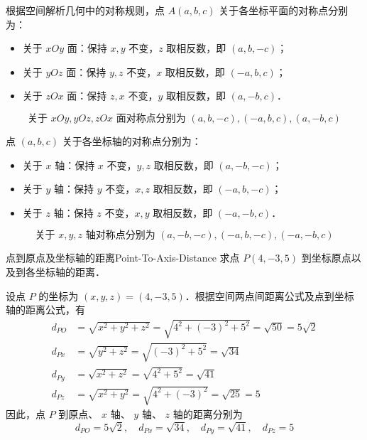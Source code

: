 \begin{solution}
    根据空间解析几何中的对称规则，点 $A(a, b, c)$ 关于各坐标平面的对称点分别为：
    \begin{itemize}
        \item 关于 $xOy$ 面：保持 $x, y$ 不变，$z$ 取相反数，即 $(a, b, -c)$；
        \item 关于 $yOz$ 面：保持 $y, z$ 不变，$x$ 取相反数，即 $(-a, b, c)$；
        \item 关于 $zOx$ 面：保持 $z, x$ 不变，$y$ 取相反数，即 $(a, -b, c)$．
    \end{itemize}
    \begin{equation}
        \boxed{\text{关于 } xOy, yOz, zOx \text{ 面对称点分别为 } (a, b, -c), (-a, b, c), (a, -b, c)}
    \end{equation}

    点 $(a, b, c)$ 关于各坐标轴的对称点分别为：
    \begin{itemize}
        \item 关于 $x$ 轴：保持 $x$ 不变，$y, z$ 取相反数，即 $(a, -b, -c)$；
        \item 关于 $y$ 轴：保持 $y$ 不变，$x, z$ 取相反数，即 $(-a, b, -c)$；
        \item 关于 $z$ 轴：保持 $z$ 不变，$x, y$ 取相反数，即 $(-a, -b, c)$．
    \end{itemize}
    \begin{equation}
        \boxed{\text{关于 } x, y, z \text{ 轴对称点分别为 } (a, -b, -c), (-a, b, -c), (-a, -b, c)}
    \end{equation}
\end{solution}


\begin{problem}{点到原点及坐标轴的距离}{Point-To-Axis-Distance}
    求点 $P(4, -3, 5)$ 到坐标原点以及到各坐标轴的距离．
\end{problem}

\begin{solution}
    设点 $P$ 的坐标为 $(x, y, z) = (4, -3, 5)$．根据空间两点间距离公式及点到坐标轴的距离公式，有
    \begin{equation}
        \begin{aligned}
            d_{PO} & = \sqrt{x^2 + y^2 + z^2} = \sqrt{4^2 + (-3)^2 + 5^2} = \sqrt{50} = 5\sqrt{2} \\
            d_{Px} & = \sqrt{y^2 + z^2} = \sqrt{(-3)^2 + 5^2} = \sqrt{34}                         \\
            d_{Py} & = \sqrt{x^2 + z^2} = \sqrt{4^2 + 5^2} = \sqrt{41}                            \\
            d_{Pz} & = \sqrt{x^2 + y^2} = \sqrt{4^2 + (-3)^2} = \sqrt{25} = 5
        \end{aligned}
    \end{equation}
    因此，点 $P$ 到原点、 $x$ 轴、 $y$ 轴、 $z$ 轴的距离分别为
    \begin{equation}
        \boxed{d_{PO} = 5\sqrt{2}, \quad d_{Px} = \sqrt{34}, \quad d_{Py} = \sqrt{41}, \quad d_{Pz} = 5}
    \end{equation}
\end{solution}

